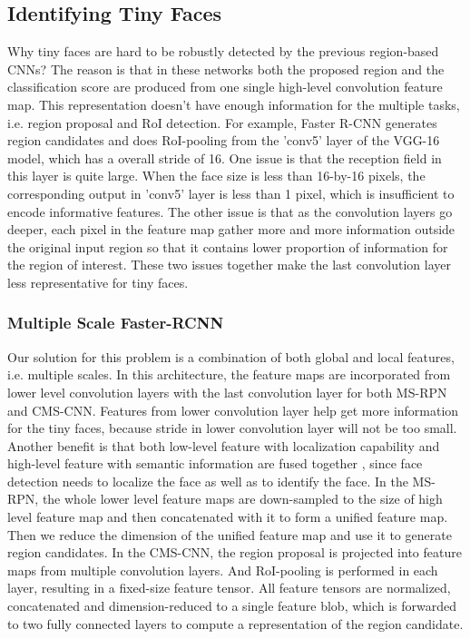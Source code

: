 \documentclass[10pt,journal,cspaper,compsoc]{IEEEtran}
\begin{document}
\subsection{Identifying Tiny Faces}
Why tiny faces are hard to be robustly detected by the previous region-based CNNs? The reason is that in these networks both the proposed region and the classification score are produced from one single high-level convolution feature map. This representation doesn't have enough information for the multiple tasks, i.e. region proposal and RoI detection. 
For example, Faster R-CNN generates region candidates and does RoI-pooling from the 'conv5' layer of the VGG-16 model, which has a overall stride of 16. One issue is that the reception field in this layer is quite large. When the face size is less than 16-by-16 pixels, the corresponding output in 'conv5' layer is less than 1 pixel, which is insufficient to encode informative features. The other issue is that as the convolution layers go deeper, each pixel in the feature map gather more and more information outside the original input region so that it contains lower proportion of information for the region of interest. These two issues together make the last convolution layer less representative for tiny faces.

\subsubsection{Multiple Scale Faster-RCNN}
Our solution for this problem is a combination of both global and local features, i.e. multiple scales. In this architecture, the feature maps are incorporated from lower level convolution layers with the last convolution layer for both MS-RPN and CMS-CNN. Features from lower convolution layer help get more information for the tiny faces, because stride in lower convolution layer will not be too small. Another benefit is that both low-level feature with localization capability and high-level feature with semantic information are fused together \cite{hariharan2015hypercolumns}, since face detection needs to localize the face as well as to identify the face.
In the MS-RPN, the whole lower level feature maps are down-sampled to the size of high level feature map and then concatenated with it to form a unified feature map. Then we reduce the dimension of the unified feature map and use it to generate region candidates. 
In the CMS-CNN, the region proposal is projected into feature maps from multiple convolution layers. And RoI-pooling is performed in each layer, resulting in a fixed-size feature tensor. All feature tensors are normalized, concatenated and dimension-reduced to a single feature blob, which is forwarded to two fully connected layers to compute a representation of the region candidate.
\end{document}
